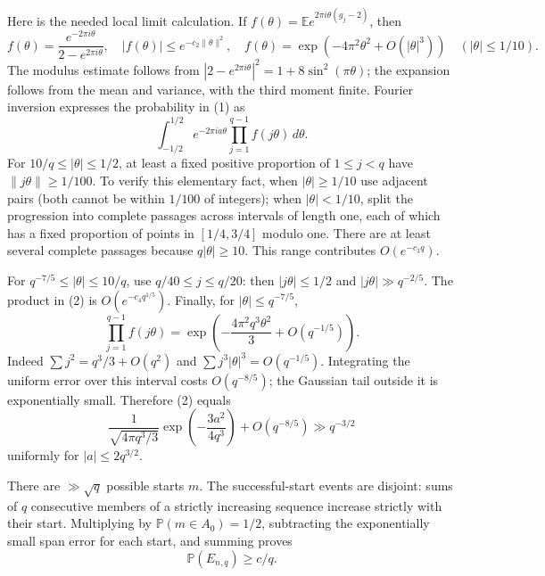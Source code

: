 Here is the needed local limit calculation. If
$f(\theta)=\mathbb E e^{2\pi i\theta(g_j-2)}$, then
\[
 f(\theta)=\frac{e^{-2\pi i\theta}}{2-e^{2\pi i\theta}},\quad
 |f(\theta)|\le e^{-c_2\|\theta\|^2},\quad
 f(\theta)=\exp(-4\pi^2\theta^2+O(|\theta|^3))
 \quad(|\theta|\le1/10).
\]
The modulus estimate follows from
$|2-e^{2\pi i\theta}|^2=1+8\sin^2(\pi\theta)$; the expansion follows from the mean and variance, with the third moment finite. Fourier inversion expresses the probability in (1) as
\[
 \int_{-1/2}^{1/2}e^{-2\pi ia\theta}
       \prod_{j=1}^{q-1}f(j\theta)\,d\theta. \tag{2}
\]
For $10/q\le|\theta|\le1/2$, at least a fixed positive proportion of $1\le j<q$ have $\|j\theta\|\ge1/100$. To verify this elementary fact, when $|\theta|\ge1/10$ use adjacent pairs (both cannot be within $1/100$ of integers); when $|\theta|<1/10$, split the progression into complete passages across intervals of length one, each of which has a fixed proportion of points in $[1/4,3/4]$ modulo one. There are at least several complete passages because $q|\theta|\ge10$. This range contributes $O(e^{-c_3q})$.

For $q^{-7/5}\le|\theta|\le10/q$, use $q/40\le j\le q/20$: then $|j\theta|\le1/2$ and $|j\theta|\gg q^{-2/5}$. The product in (2) is $O(e^{-c_4q^{1/5}})$. Finally, for $|\theta|\le q^{-7/5}$,
\[
 \prod_{j=1}^{q-1}f(j\theta)
 =\exp\left(-\frac{4\pi^2q^3\theta^2}{3}+O(q^{-1/5})\right).
\]
Indeed $\sum j^2=q^3/3+O(q^2)$ and $\sum j^3|\theta|^3=O(q^{-1/5})$. Integrating the uniform error over this interval costs $O(q^{-8/5})$; the Gaussian tail outside it is exponentially small. Therefore (2) equals
\[
 \frac1{\sqrt{4\pi q^3/3}}
       \exp\left(-\frac{3a^2}{4q^3}\right)+O(q^{-8/5})
 \gg q^{-3/2}
\]
uniformly for $|a|\le2q^{3/2}$.

There are $\gg\sqrt q$ possible starts $m$. The successful-start events are disjoint: sums of $q$ consecutive members of a strictly increasing sequence increase strictly with their start. Multiplying by $\mathbb P(m\in A_0)=1/2$, subtracting the exponentially small span error for each start, and summing proves
\[
 \mathbb P(E_{n,q})\ge c/q. \tag{3}
\]

